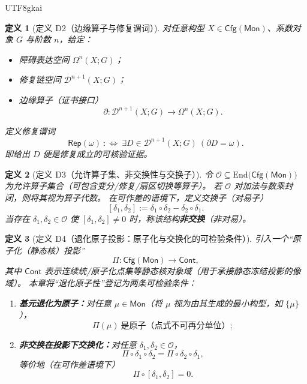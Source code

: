 \documentclass[12pt]{article}
\newtheorem{definition}{定义}[section]
\begin{document}
\begin{CJK*}{UTF8}{gkai}
\begin{definition}[定义 D2（边缘算子与修复谓词）]
\label{def:tex29-top-boundary-rep}
对任意构型 $X\in\mathsf{Cfg}(\mathsf{Mon})$、系数对象 $G$ 与阶数 $n$，给定：
\begin{itemize}
  \item 障碍表达空间 $\Omega^n(X;G)$；
  \item 修复链空间 $\mathcal{D}^{n+1}(X;G)$；
  \item 边缘算子（证书接口）
  \[
    \partial:\mathcal{D}^{n+1}(X;G)\to \Omega^n(X;G).
  \]
\end{itemize}
定义修复谓词
\[
  \mathsf{Rep}(\omega)\ :\Longleftrightarrow\ \exists D\in\mathcal{D}^{n+1}(X;G)\ (\partial D=\omega).
\]
即给出 $D$ 便是修复成立的可核验证据。
\end{definition}

\begin{definition}[定义 D3（允许算子集、非交换性与交换子）]
\label{def:tex29-top-operators}
令 $\mathcal{O}\subseteq \mathrm{End}\bigl(\mathsf{Cfg}(\mathsf{Mon})\bigr)$ 为允许算子集合（可包含变分/修复/扇区切换等算子）。
若 $\mathcal{O}$ 对加法与数乘封闭，则将其视为算子代数。
在可作差的语境下，定义交换子（对易子）
\[
  [\delta_1,\delta_2]:=\delta_1\circ\delta_2-\delta_2\circ\delta_1.
\]
当存在 $\delta_1,\delta_2\in\mathcal{O}$ 使 $[\delta_1,\delta_2]\neq 0$ 时，称该结构\textbf{非交换}（非对易）。
\end{definition}

\begin{definition}[定义 D4（退化原子投影：原子化与交换化的可检验条件）]
\label{def:tex29-top-degeneration-projection}
引入一个“原子化（静态核）投影”
\[
  \Pi:\mathsf{Cfg}(\mathsf{Mon})\to \mathsf{Cont},
\]
其中 $\mathsf{Cont}$ 表示连续统/原子化点集等静态核对象域（用于承接静态冻结投影的像域）。
本章将“退化原子性”登记为两条可检验条件：
\begin{enumerate}
  \item \textbf{基元退化为原子：}对任意 $\mu\in\mathsf{Mon}$（将 $\mu$ 视为由其生成的最小构型，如 $\{\mu\}$），
  \[
    \Pi(\mu)\ \text{是原子（点式不可再分单位）};
  \]
  \item \textbf{非交换在投影下交换化：}对任意 $\delta_1,\delta_2\in\mathcal{O}$，
  \[
    \Pi\circ\delta_1\circ\delta_2=\Pi\circ\delta_2\circ\delta_1,
  \]
  等价地（在可作差语境下）
  \[
    \Pi\circ[\delta_1,\delta_2]=0.
  \]
\end{enumerate}
\end{definition}


\end{CJK*}
\end{document}
